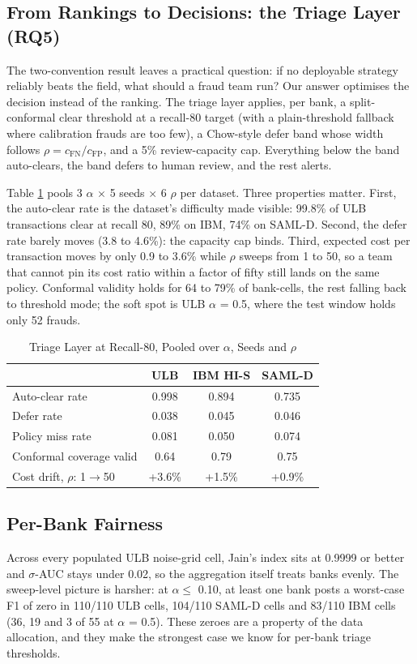 \documentclass[a4paper, 10pt, conference]{ieeeconf}
\begin{document}
\subsection{From Rankings to Decisions: the Triage Layer (RQ5)}
The two-convention result leaves a practical question: if no deployable strategy
reliably beats the field, what should a fraud team run? Our answer optimises the
decision instead of the ranking. The triage layer applies, per bank, a
split-conformal clear threshold at a recall-80 target (with a plain-threshold
fallback where calibration frauds are too few), a Chow-style defer band
\cite{r29} whose width follows $\rho = c_{\mathrm{FN}}/c_{\mathrm{FP}}$, and a
5\% review-capacity cap. Everything below the band auto-clears, the band defers
to human review, and the rest alerts.

Table \ref{tab:triage} pools 3 $\alpha$ $\times$ 5 seeds $\times$ 6 $\rho$ per
dataset. Three properties matter. First, the auto-clear rate is the dataset's
difficulty made visible: 99.8\% of ULB transactions clear at recall 80, 89\% on
IBM, 74\% on SAML-D. Second, the defer rate barely moves (3.8 to 4.6\%): the
capacity cap binds. Third, expected cost per transaction moves by only 0.9 to
3.6\% while $\rho$ sweeps from 1 to 50, so a team that cannot pin its cost ratio
within a factor of fifty still lands on the same policy. Conformal validity
holds for 64 to 79\% of bank-cells, the rest falling back to threshold mode; the
soft spot is ULB $\alpha$ = 0.5, where the test window holds only 52 frauds.

\begin{table}[!tb]
\caption{Triage Layer at Recall-80, Pooled over $\alpha$, Seeds and $\rho$}\label{tab:triage}
\centering\scriptsize
\setlength{\tabcolsep}{4pt}
\begin{tabular}{@{}lccc@{}}
\hline
 & \textbf{ULB} & \textbf{IBM HI-S} & \textbf{SAML-D} \\ \hline
Auto-clear rate & 0.998 & 0.894 & 0.735 \\
Defer rate & 0.038 & 0.045 & 0.046 \\
Policy miss rate & 0.081 & 0.050 & 0.074 \\
Conformal coverage valid & 0.64 & 0.79 & 0.75 \\
Cost drift, $\rho$: 1$\to$50 & +3.6\% & +1.5\% & +0.9\% \\ \hline
\end{tabular}
\end{table}

\subsection{Per-Bank Fairness}
Across every populated ULB noise-grid cell, Jain's index sits at 0.9999 or
better and $\sigma$-AUC stays under 0.02, so the aggregation itself treats banks
evenly. The sweep-level picture is harsher: at $\alpha \le$ 0.10, at least one
bank posts a worst-case F1 of zero in 110/110 ULB cells, 104/110 SAML-D cells
and 83/110 IBM cells (36, 19 and 3 of 55 at $\alpha$ = 0.5). These zeroes are a
property of the data allocation, and they make the strongest case we know for
per-bank triage thresholds.
\end{document}
